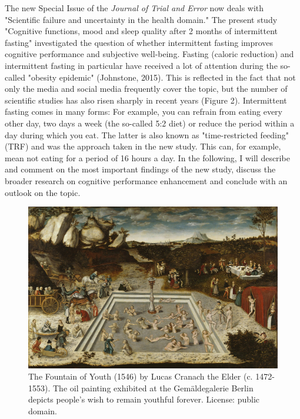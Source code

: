 \documentclass[authordate, empirical]{jote-new-article}
\begin{document}
The new Special Issue of the \emph{Journal of Trial and Error} now deals with "Scientific failure and uncertainty in the health domain." The present study "Cognitive functions, mood and sleep quality after 2 months of intermittent fasting" investigated the question of whether intermittent fasting improves cognitive performance and subjective well-being. Fasting (caloric reduction) and intermittent fasting in particular have received a lot of attention during the so-called "obesity epidemic" (Johnstone, 2015). This is reflected in the fact that not only the media and social media frequently cover the topic, but the number of scientific studies has also risen sharply in recent years (Figure 2). Intermittent fasting comes in many forms: For example, you can refrain from eating every other day, two days a week (the so-called 5:2 diet) or reduce the period within a day during which you eat. The latter is also known as "time-restricted feeding" (TRF) and was the approach taken in the new study. This can, for example, mean not eating for a period of 16 hours a day. In the following, I will describe and comment on the most important findings of the new study, discuss the broader research on cognitive performance enhancement and conclude with an outlook on the topic.





\begin{figure}[t]
  \begin{fullwidth}
    \includegraphics[width=\linewidth]{media/image1.jpg}
    \caption{The Fountain of Youth (1546) by Lucas Cranach the Elder (c. 1472-1553). The oil painting exhibited at the Gemäldegalerie Berlin depicts people's wish to remain youthful forever. License: public domain.}
    \label{fig:fountain}


  \end{fullwidth}

\end{figure}
\end{document}
